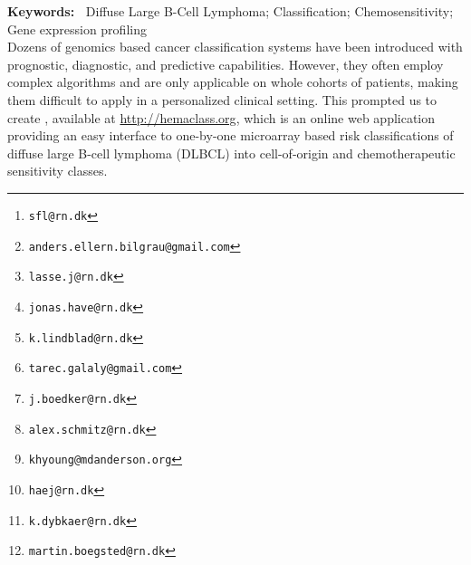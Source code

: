 

\title{\hemaClassTitle{}\vspace{-2ex}}

\author[1]{\small Steffen Falgreen\thanks{\texttt{sfl@rn.dk}}}
\author[12]{Anders Ellern Bilgrau\thanks{\texttt{anders.ellern.bilgrau@gmail.com}}}
\author[12]{Lasse Hjort Jakobsen\thanks{\texttt{lasse.j@rn.dk}}}
\author[12]{Jonas Have\thanks{\texttt{jonas.have@rn.dk}}}
\author[12]{Kasper Lindblad Nielsen\thanks{\texttt{k.lindblad@rn.dk}}}
\author[1]{Tarec Christoffer El-Galaly\thanks{\texttt{tarec.galaly@gmail.com}}}
\author[1]{Julie St{\o}ve  B{\o}dker\thanks{\texttt{j.boedker@rn.dk}}}
\author[1]{Alexander Schmitz\thanks{\texttt{alex.schmitz@rn.dk}}}
\author[3]{Ken H. Young\thanks{\texttt{khyoung@mdanderson.org}}}
\author[12]{Hans Erik Johnsen\thanks{\texttt{haej@rn.dk}}}
\author[12]{Karen Dybk{\ae}r\thanks{\texttt{k.dybkaer@rn.dk}}}
\author[12]{Martin B{\o}gsted\thanks{\texttt{martin.boegsted@rn.dk}}}

\date{\small \today\vspace{-2ex}}




\maketitle
\textbf{Keywords:~}
Diffuse Large B-Cell Lymphoma; Classification; Chemosensitivity; Gene expression profiling \\

Dozens of genomics based cancer classification systems have been introduced with prognostic, diagnostic, and predictive capabilities.
However, they often employ complex algorithms and are only applicable on whole cohorts of patients, making them difficult to apply in a personalized clinical setting. This prompted us to create \hemaClass{}, available at \url{http://hemaclass.org}, which is an online web application providing an easy interface to one-by-one microarray based risk classifications of diffuse large B-cell lymphoma (DLBCL) into cell-of-origin and chemotherapeutic sensitivity classes.


